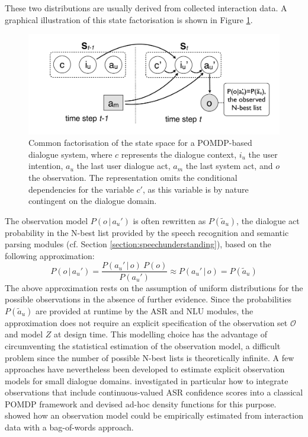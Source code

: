 These two distributions are usually derived from collected interaction data. A graphical illustration of this state factorisation is shown in Figure \ref{fig:pomdp2}. 

\begin{figure}[ht]
\centering
\includegraphics[scale=0.28]{imgs/POMDP2.pdf}
\caption{Common factorisation of the state space for a POMDP-based dialogue system, where $c$ represents the dialogue context, $i_u$ the user intention, $a_u$ the last user dialogue act, $a_m$ the last system act, and $o$ the observation. The representation omits the conditional dependencies  for the variable $c'$, as this variable is by nature contingent on the dialogue domain.}
\label{fig:pomdp2}
\end{figure}

The observation model $P(o \, | \, a_u')$ is often rewritten as $P(\tilde{a}_u)$, the dialogue act probability in the N-best list provided by the speech recognition and semantic parsing modules (cf. Section \ref{section:speechunderstanding}), based on the following approximation:
\begin{equation}
P(o \, | \, a_u') = \frac{P(a_u' \, | \, o) \ P(o)} {P(a_u')} \approx P(a_u' \, | \, o) = P(\tilde{a}_u)
\end{equation}
The above approximation rests on the assumption of uniform distributions for the possible observations in the absence of further evidence. Since the probabilities $P(\tilde{a}_u)$ are provided at runtime by the ASR and NLU modules, the approximation does not require an explicit specification of the observation set $\mathcal{O}$ and model $Z$ at design time.  This modelling choice has the advantage of circumventing the statistical estimation of the observation model, a difficult problem since the number of possible N-best lists is theoretically infinite. A few approaches have nevertheless been developed to estimate explicit observation models for small dialogue domains. \cite{Williamsetal:2008} investigated in particular how to integrate observations that include continuous-valued ASR confidence scores into a classical POMDP framework and devised ad-hoc density functions for this purpose.  \cite{chinaei2012} showed how an observation model could be empirically estimated from interaction data with a bag-of-words approach. 

